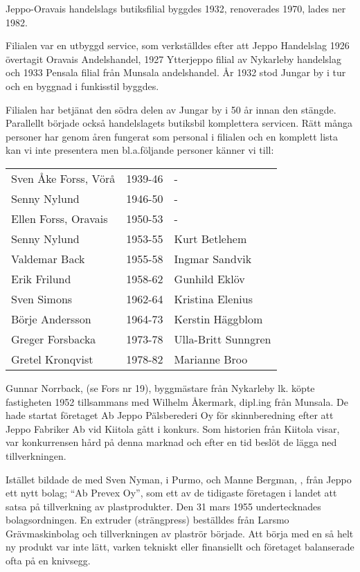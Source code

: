 Jeppo-Oravais handelslags butiksfilial byggdes 1932, renoverades 1970, lades ner 1982.

Filialen var en  utbyggd service, som verkställdes efter att Jeppo Handelslag 1926 övertagit Oravais Andelshandel, 1927 Ytterjeppo filial av Nykarleby handelslag och 1933 Pensala filial från Munsala andelshandel. År 1932 stod Jungar by i tur och en byggnad i funkisstil byggdes.

Filialen har betjänat den södra delen av Jungar by i 50 år innan den stängde. Parallellt började också handelslagets butiksbil komplettera servicen. Rätt många personer har genom åren fungerat som personal i filialen och en komplett lista kan vi inte presentera men bl.a.följande personer känner vi till:
\begin{center}
  \begin{tabular}{l l | l}
    Sven Åke Forss, Vörå & 1939-46 & - \\
    Senny Nylund & 1946-50 & - \\
    Ellen Forss, Oravais & 1950-53 & - \\
    Senny Nylund & 1953-55 & Kurt Betlehem \\
    Valdemar Back & 1955-58 & Ingmar Sandvik \\
    Erik Frilund & 1958-62 & Gunhild Eklöv \\
    Sven Simons & 1962-64 & Kristina Elenius \\
    Börje Andersson & 1964-73 & Kerstin Häggblom \\
    Greger Forsbacka & 1973-78 & Ulla-Britt Sunngren \\
    Gretel Kronqvist & 1978-82 & Marianne Broo \\
  \end{tabular}
\end{center}



Gunnar Norrback,  (se Fors nr 19), byggmästare från Nykarleby lk. köpte fastigheten 1952 tillsammans med Wilhelm Åkermark, dipl.ing från Munsala. De hade startat företaget Ab Jeppo Pälsberederi Oy för skinnberedning efter att Jeppo Fabriker Ab vid Kiitola gått i konkurs. Som historien från Kiitola visar, var konkurrensen hård på denna marknad och efter en tid beslöt de lägga ned tillverkningen.


Istället bildade de med Sven Nyman,  i Purmo, och Manne Bergman, , från Jeppo ett nytt bolag; ``Ab Prevex Oy'', som ett av de tidigaste företagen i landet att satsa på tillverkning av plastprodukter. Den 31 mars 1955 undertecknades bolagsordningen. En extruder (strängpress) beställdes från Larsmo Grävmaskinbolag och  tillverkningen av plaströr började. Att börja med en så helt ny produkt var inte lätt, varken tekniskt eller finansiellt och företaget balanserade ofta på en knivsegg.

